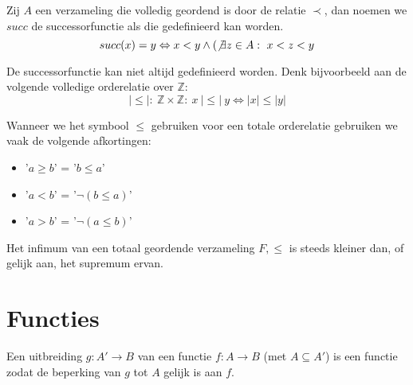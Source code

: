 \documentclass[main.tex]{subfiles}
\begin{document}
\begin{de}
  Zij $A$ een verzameling die volledig geordend is door de relatie $\prec$, dan noemen we $succ$ de successorfunctie als die gedefinieerd kan worden.
  \[ succ(x) = y \Leftrightarrow x < y \wedge (\not\exists z \in A:\ x < z < y \]
\end{de}

\begin{opm}
  De successorfunctie kan niet altijd gedefinieerd worden.
  Denk bijvoorbeeld aan de volgende volledige orderelatie over $\mathbb{Z}$:
  \[ |\le|:\ \mathbb{Z} \times \mathbb{Z}:\ x\ |\le|\ y \Leftrightarrow |x| \le |y| \]
\end{opm}

\begin{de}
  Wanneer we het symbool $\le$ gebruiken voor een totale orderelatie gebruiken we vaak de volgende afkortingen:
  \begin{itemize}
  \item '$a \ge b$' = '$b \le a$'
  \item '$a < b$' = '$\neg(b \le a)$'
  \item '$a > b$' = '$\neg(a \le b)$'
  \end{itemize}
\end{de}

\begin{st}
  \label{st:infimum-kleiner-dan-supremum}
  Het infimum van een totaal geordende verzameling $F,\le$ is steeds kleiner dan, of gelijk aan, het supremum ervan.
\end{st}

\section{Functies}
\label{sec:functies}


\begin{de}
  Een uitbreiding $g:A' \rightarrow B$ van een functie $f:A \rightarrow B$ (met $A \subseteq A'$) is een functie zodat de beperking van $g$ tot $A$ gelijk is aan $f$.
\end{de}
\end{document}
